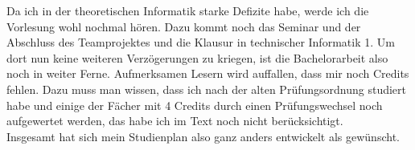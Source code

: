 Da ich in der theoretischen
 Informatik starke Defizite habe, werde ich die Vorlesung wohl nochmal
 hören. Dazu kommt noch das Seminar und der Abschluss des
 Teamprojektes und die Klausur in technischer Informatik 1. Um dort
 nun keine weiteren Verzögerungen zu kriegen, ist die Bachelorarbeit
 also noch in weiter Ferne. Aufmerksamen Lesern wird auffallen, dass
 mir noch Credits fehlen. Dazu muss man wissen, dass ich nach der
 alten Prüfungsordnung studiert habe und einige der Fächer mit 4
 Credits durch einen Prüfungswechsel noch aufgewertet werden, das habe
 ich im Text noch nicht berücksichtigt.\\
Insgesamt hat sich mein Studienplan also
 ganz anders entwickelt als gewünscht.
